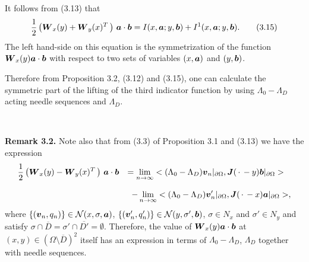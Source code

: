 It follows from (3.13) that
$$\displaystyle
\frac{1}{2}\left(\mbox{\boldmath $W$}_x(y)+\mbox{\boldmath $W$}_y(x)^T\,\right)\,\mbox{\boldmath $a$}\cdot\mbox{\boldmath $b$}
=I(x,\mbox{\boldmath $a$};y,\mbox{\boldmath $b$})+I^1(x,\mbox{\boldmath $a$};y,\mbox{\boldmath $b$}).
\tag {3.15}
$$
The left hand-side on this equation is the symmetrization of  the function
$\mbox{\boldmath $W$}_x(y)\mbox{\boldmath $a$}\cdot\mbox{\boldmath $b$}$ with respect to
two sets of variables $(x,\mbox{\boldmath $a$})$ and $(y,\mbox{\boldmath $b$})$.
 
 
 

Therefore from Proposition 3.2, (3.12) and (3.15), one can calculate the symmetric part of  the lifting of the third indicator function by using $\Lambda_0-\Lambda_D$ acting needle sequences and $\Lambda_D$.

$\quad$

{\bf\noindent Remark 3.2.}
Note also that from (3.3) of Proposition 3.1 and (3.13) we have the expression
$$\begin{array}{ll}
\displaystyle
\frac{1}{2}\left(\mbox{\boldmath $W$}_x(y)-\mbox{\boldmath $W$}_y(x)^T\,\right)\,\mbox{\boldmath $a$}\cdot\mbox{\boldmath $b$}
&
\displaystyle
=\lim_{n\rightarrow\infty}
<(\Lambda_0-\Lambda_D)\mbox{\boldmath $v$}_n\vert_{\partial\Omega},
\mbox{\boldmath $J$}(\,\cdot\,-y)\mbox{\boldmath $b$}\vert_{\partial\Omega}>
\\
\\
\displaystyle
&
\displaystyle
\,\,\,
-\lim_{n\rightarrow\infty}
<(\Lambda_0-\Lambda_D)\mbox{\boldmath $v$}_n'\vert_{\partial\Omega},
\mbox{\boldmath $J$}(\,\cdot\,-x)\mbox{\boldmath $a$}\vert_{\partial\Omega}>,
\end{array}
$$
where $\{(\mbox{\boldmath $v$}_n, q_n)\}\in{\cal N}(x,\sigma,\mbox{\boldmath $a$})$,
 $\{(\mbox{\boldmath $v$}_n', q_n')\}\in{\cal N}(y,\sigma',\mbox{\boldmath $b$})$, $\sigma\in N_x$ and $\sigma'\in N_y$
 and satisfy $\sigma\cap\overline{D}=\sigma'\cap\overline{D'}=\emptyset$.
Therefore, the value of $\mbox{\boldmath $W$}_x(y)\mbox{\boldmath $a$}\cdot\mbox{\boldmath $b$}$ 
at $(x,y)\in(\Omega\setminus\overline{D})^2$ itself
has an expression in terms of  $\Lambda_0-\Lambda_D$, $\Lambda_D$ together with needle sequences.




$\quad$





 
 
 

